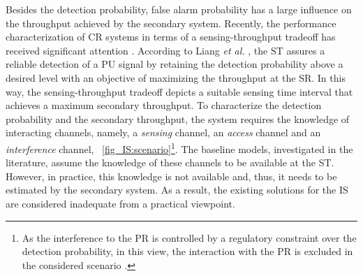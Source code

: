 

Besides the detection probability, false alarm probability has a large influence on the throughput achieved by the secondary system. %
Recently, the performance characterization of CR systems in terms of a sensing-throughput tradeoff has received significant attention \cite{Liang08, Juarez11, Sharkasi12, Pradhan15}. According to Liang \textit{et al.} \cite{Liang08}, the ST assures a reliable detection of a PU signal by retaining the detection probability above a desired level with an objective of maximizing the throughput at the SR. In this way, the sensing-throughput tradeoff depicts a suitable sensing time interval that achieves a maximum secondary throughput. To characterize the detection probability and the secondary throughput, the system requires the knowledge of interacting channels, namely, a \textit{sensing} channel, an \textit{access} channel and an \textit{interference} channel,  \figurename~\ref{fig_IS:scenario}\footnote{As the interference to the PR is controlled by a regulatory constraint over the detection probability, in this view, the interaction with the PR is excluded in the considered scenario \cite{Liang08}.}. The baseline models, investigated in the literature, assume the knowledge of these channels to be available at the ST. 
However, in practice, this knowledge is not available and, thus, it needs to be estimated by the secondary system. As a result, the existing solutions for the IS are considered inadequate from a practical viewpoint. 


